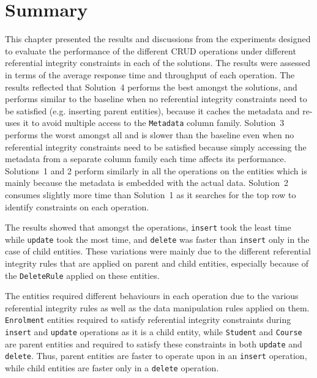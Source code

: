 \section{Summary} \label{s:results-summary}

This chapter presented the results and discussions from the experiments designed
to evaluate the performance of the different \ac{CRUD} operations under
different referential integrity constraints in each of the solutions.
The results were assessed in terms of the average response time and throughput
of each operation. The results reflected that Solution~4 performs the best
amongst the solutions, and performs similar to the baseline when no referential
integrity constraints need to be satisfied (e.g. inserting parent entities),
because it caches the metadata and re-uses it to avoid multiple access to the
\texttt{Metadata} column family.
Solution~3 performs the worst amongst all and is slower than the baseline even
when no referential integrity constraints need to be satisfied because
simply accessing the metadata from a separate column family each time affects
its performance.
Solutions~1 and 2 perform similarly in all the operations on the entities which
is mainly because the metadata is embedded with the actual data.   Solution~2
consumes slightly more time than Solution~1 as it searches for the top row to
identify constraints on each operation.

The results showed that amongst the operations,   \texttt{insert} took the least
time while \texttt{update} took the most time,   and \texttt{delete} was faster
than \texttt{insert} only in the case of child entities.   These variations were
mainly due to the different referential integrity rules that are applied on
parent and child entities,   especially because of the \texttt{DeleteRule}
applied on these entities.  

The entities required different behaviours in each operation due to the various
referential integrity rules as well as  the data manipulation rules applied on
them.
\texttt{Enrolment} entities required to satisfy referential integrity
constraints during \texttt{insert} and \texttt{update} operations as it is a child entity,
while \texttt{Student} and \texttt{Course} are parent entities and required to
satisfy these constraints in both \texttt{update} and \texttt{delete}.   Thus,
parent entities are faster to operate upon in an \texttt{insert} operation,  
while child entities are faster only in a \texttt{delete} operation.
	
